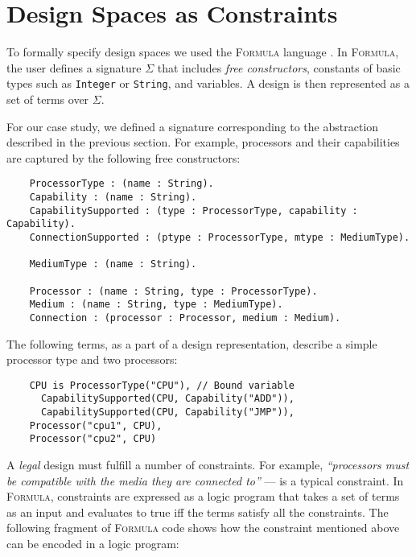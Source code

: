 \documentclass[conference]{IEEEtran}
\newcommand{\FORMULA}{\textsc{Formula}}
\begin{document}
\section{Design Spaces as Constraints}

\newcommand{\DataSig}{\Sigma}
\newcommand{\FreeCons}{F}
\newcommand{\Consts}{C}
\newcommand{\Vars}{V}

To formally specify design spaces we used the \FORMULA{} language \cite{??}. In \FORMULA{}, the user defines a signature $\DataSig$ that includes \emph{free constructors}, constants of basic types such as \texttt{Integer} or \texttt{String}, and variables. A design is then represented as a set of terms over $\DataSig$. 

For our case study, we defined a signature corresponding to the abstraction described in the previous section. For example, processors and their capabilities are captured by the following free constructors:

{\scriptsize\begin{verbatim}
    ProcessorType : (name : String).    
    Capability : (name : String).
    CapabilitySupported : (type : ProcessorType, capability : Capability).    
    ConnectionSupported : (ptype : ProcessorType, mtype : MediumType).
    
    MediumType : (name : String).

    Processor : (name : String, type : ProcessorType).
    Medium : (name : String, type : MediumType).    
    Connection : (processor : Processor, medium : Medium).
\end{verbatim}}

The following terms, as a part of a design representation, describe a simple processor type and two processors:    

{\scriptsize\begin{verbatim}
    CPU is ProcessorType("CPU"), // Bound variable
      CapabilitySupported(CPU, Capability("ADD")),
      CapabilitySupported(CPU, Capability("JMP")),
    Processor("cpu1", CPU),
    Processor("cpu2", CPU)
\end{verbatim}}

A \emph{legal} design must fulfill a number of constraints. For example, 
\emph{``processors must be compatible with the media they are connected to''} --- is a typical constraint.
In \FORMULA{}, constraints are expressed as a logic program that takes a set of terms as an input and evaluates to true iff the terms satisfy all the constraints. The following fragment of \FORMULA{} code shows how the constraint mentioned above can be encoded in a logic program:
\end{document}
